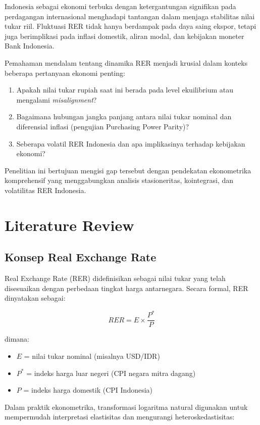 \documentclass[12pt]{article}
\begin{document}
Indonesia sebagai ekonomi terbuka dengan ketergantungan signifikan pada perdagangan internasional menghadapi tantangan dalam menjaga stabilitas nilai tukar riil. Fluktuasi RER tidak hanya berdampak pada daya saing ekspor, tetapi juga berimplikasi pada inflasi domestik, aliran modal, dan kebijakan moneter Bank Indonesia.

Pemahaman mendalam tentang dinamika RER menjadi krusial dalam konteks beberapa pertanyaan ekonomi penting:
\begin{enumerate}
    \item Apakah nilai tukar rupiah saat ini berada pada level ekuilibrium atau mengalami \textit{misalignment}?
    \item Bagaimana hubungan jangka panjang antara nilai tukar nominal dan diferensial inflasi (pengujian Purchasing Power Parity)?
    \item Seberapa volatil RER Indonesia dan apa implikasinya terhadap kebijakan ekonomi?
\end{enumerate}

Penelitian ini bertujuan mengisi gap tersebut dengan pendekatan ekonometrika komprehensif yang menggabungkan analisis stasioneritas, kointegrasi, dan volatilitas RER Indonesia.
\section{Literature Review}
\subsection{Konsep Real Exchange Rate}

Real Exchange Rate (RER) didefinisikan sebagai nilai tukar yang telah disesuaikan dengan perbedaan tingkat harga antarnegara. Secara formal, RER dinyatakan sebagai:

\begin{equation}
    RER = E \times \frac{P^*}{P}
\end{equation}

dimana:
\begin{itemize}
    \item $E$ = nilai tukar nominal (misalnya USD/IDR)
    \item $P^*$ = indeks harga luar negeri (CPI negara mitra dagang)
    \item $P$ = indeks harga domestik (CPI Indonesia)
\end{itemize}

Dalam praktik ekonometrika, transformasi logaritma natural digunakan untuk mempermudah interpretasi elastisitas dan mengurangi heteroskedastisitas:
\end{document}
